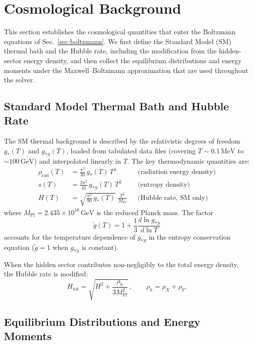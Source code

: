 \documentclass[11pt]{article}
\numberwithin{equation}{section}
\newcommand{\GeV}{\,\text{GeV}}
\newcommand{\MeV}{\,\text{MeV}}
\newcommand{\Mpl}{M_{\text{Pl}}}
\newcommand{\gstar}{g_*}
\newcommand{\gstarS}{g_{*S}}
\newcommand{\gtilde}{\tilde{g}}
\begin{document}
\section{Cosmological Background}
\label{sec:cosmology}
This section establishes the cosmological quantities that enter the Boltzmann equations of Sec.~\ref{sec:boltzmann}. We first define the Standard Model (SM) thermal bath and the Hubble rate, including the modification from the hidden-sector energy density, and then collect the equilibrium distributions and energy moments under the Maxwell--Boltzmann approximation that are used throughout the solver.
\subsection{Standard Model Thermal Bath and Hubble Rate}

The SM thermal background is described by the relativistic degrees of freedom $\gstar(T)$ and $\gstarS(T)$, loaded from tabulated data files (covering $T\sim 0.1\MeV$ to $\sim 100\GeV$) and interpolated linearly in $T$. The key thermodynamic quantities are:
\begin{align}
    \rho_{\text{rad}}(T) &= \frac{\pi^2}{30}\,\gstar(T)\,T^4 &
    &\text{(radiation energy density)} \label{eq:rhoR}\\
    s(T) &= \frac{2\pi^2}{45}\,\gstarS(T)\,T^3 &
    &\text{(entropy density)} \\
    H(T) &= \sqrt{\frac{\pi^2}{90}\,\gstar(T)}\;\frac{T^2}{\Mpl} &
    &\text{(Hubble rate, SM only)}
\end{align}
where $\Mpl = 2.435\times 10^{18}\GeV$ is the reduced Planck mass. The factor
\begin{equation}
    \gtilde(T) = 1 + \frac{1}{3}\frac{d\ln \gstarS}{d\ln T}\label{eq:gtilde}
\end{equation}
accounts for the temperature dependence of $\gstarS$ in the entropy conservation equation ($\gtilde = 1$ when $\gstarS$ is constant).

When the hidden sector contributes non-negligibly to the total energy density, the Hubble rate is modified:
\begin{equation}
    H_{\text{tot}} = \sqrt{H^2 + \frac{\rho_h}{3\Mpl^2}}\,, \qquad
    \rho_{h} = \rho_X +\rho_Y. \label{eq:Htot}
\end{equation}

\subsection{Equilibrium Distributions and Energy Moments}
\label{sec:bessel}
\end{document}
